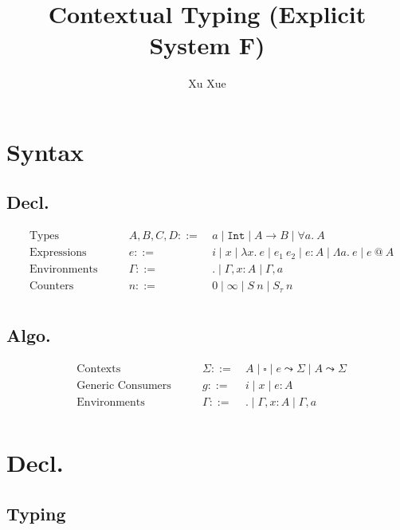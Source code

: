 \documentclass{article}
\title{Contextual Typing (Explicit System F)}
\author{Xu Xue}
\begin{document}
\maketitle

\section{Syntax}

\subsection{Decl.}

\begin{align*}
&\text{Types} \quad\quad &A, B, C, D ::=&~ a \mid \mathtt{Int} \mid A \rightarrow B \mid \forall a.~A \\
&\text{Expressions} \quad \quad &e::=&~ i \mid x \mid \lambda x . ~e \mid e_1~e_2 \mid e : A \mid \Lambda a.~e \mid e ~@~ A\\
&\text{Environments} \quad\quad &\Gamma::=&~ . \mid \Gamma, x : A \mid \Gamma, a\\
&\text{Counters} \quad\quad &n ::=&~ 0 \mid \infty \mid S~n \mid S_{\tau}~n\\
\end{align*}

\subsection{Algo.}

\begin{align*}
    &\text{Contexts} \quad\quad &\Sigma ::=&~ A \mid \square \mid \boxed{e} \leadsto \Sigma \mid \boxed{A} \leadsto \Sigma\\
    &\text{Generic Consumers} \quad \quad &g::=&~ i \mid x \mid e : A \\
    &\text{Environments} \quad\quad &\Gamma ::=&~ . \mid \Gamma, x : A \mid \Gamma, a \\
\end{align*}


\section{Decl.}

\subsection{Typing}
\end{document}
